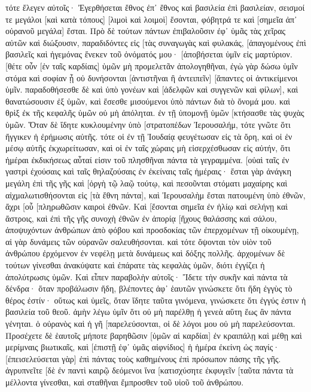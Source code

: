 τότε ἔλεγεν αὐτοῖς· Ἐγερθήσεται ἔθνος ἐπ᾽ ἔθνος καὶ βασιλεία ἐπὶ βασιλείαν, 
σεισμοί τε μεγάλοι [καὶ κατὰ τόπους] [λιμοὶ καὶ λοιμοὶ] ἔσονται, φόβητρά τε καὶ [σημεῖα ἀπ᾽ οὐρανοῦ μεγάλα] ἔσται. 
Πρὸ δὲ τούτων πάντων ἐπιβαλοῦσιν ἐφ᾽ ὑμᾶς τὰς χεῖρας αὐτῶν καὶ διώξουσιν, παραδιδόντες εἰς [τὰς συναγωγὰς καὶ φυλακάς, [ἀπαγομένους ἐπὶ βασιλεῖς καὶ ἡγεμόνας ἕνεκεν τοῦ ὀνόματός μου· 
[ἀποβήσεται ὑμῖν εἰς μαρτύριον. 
[θέτε οὖν [ἐν ταῖς καρδίαις] ὑμῶν μὴ προμελετᾶν ἀπολογηθῆναι, 
ἐγὼ γὰρ δώσω ὑμῖν στόμα καὶ σοφίαν ᾗ οὐ δυνήσονται [ἀντιστῆναι ἢ ἀντειπεῖν] [ἅπαντες οἱ ἀντικείμενοι ὑμῖν. 
παραδοθήσεσθε δὲ καὶ ὑπὸ γονέων καὶ [ἀδελφῶν καὶ συγγενῶν καὶ φίλων], καὶ θανατώσουσιν ἐξ ὑμῶν, 
καὶ ἔσεσθε μισούμενοι ὑπὸ πάντων διὰ τὸ ὄνομά μου. 
καὶ θρὶξ ἐκ τῆς κεφαλῆς ὑμῶν οὐ μὴ ἀπόληται. 
ἐν τῇ ὑπομονῇ ὑμῶν [κτήσασθε τὰς ψυχὰς ὑμῶν. 
Ὅταν δὲ ἴδητε κυκλουμένην ὑπὸ [στρατοπέδων Ἰερουσαλήμ, τότε γνῶτε ὅτι ἤγγικεν ἡ ἐρήμωσις αὐτῆς. 
τότε οἱ ἐν τῇ Ἰουδαίᾳ φευγέτωσαν εἰς τὰ ὄρη, καὶ οἱ ἐν μέσῳ αὐτῆς ἐκχωρείτωσαν, καὶ οἱ ἐν ταῖς χώραις μὴ εἰσερχέσθωσαν εἰς αὐτήν, 
ὅτι ἡμέραι ἐκδικήσεως αὗταί εἰσιν τοῦ πλησθῆναι πάντα τὰ γεγραμμένα. 
[οὐαὶ ταῖς ἐν γαστρὶ ἐχούσαις καὶ ταῖς θηλαζούσαις ἐν ἐκείναις ταῖς ἡμέραις· ἔσται γὰρ ἀνάγκη μεγάλη ἐπὶ τῆς γῆς καὶ [ὀργὴ τῷ λαῷ τούτῳ, 
καὶ πεσοῦνται στόματι μαχαίρης καὶ αἰχμαλωτισθήσονται εἰς [τὰ ἔθνη πάντα], καὶ Ἰερουσαλὴμ ἔσται πατουμένη ὑπὸ ἐθνῶν, ἄχρι [οὗ [πληρωθῶσιν καιροὶ ἐθνῶν. 
Καὶ [ἔσονται σημεῖα ἐν ἡλίῳ καὶ σελήνῃ καὶ ἄστροις, καὶ ἐπὶ τῆς γῆς συνοχὴ ἐθνῶν ἐν ἀπορίᾳ [ἤχους θαλάσσης καὶ σάλου, 
ἀποψυχόντων ἀνθρώπων ἀπὸ φόβου καὶ προσδοκίας τῶν ἐπερχομένων τῇ οἰκουμένῃ, αἱ γὰρ δυνάμεις τῶν οὐρανῶν σαλευθήσονται. 
καὶ τότε ὄψονται τὸν υἱὸν τοῦ ἀνθρώπου ἐρχόμενον ἐν νεφέλῃ μετὰ δυνάμεως καὶ δόξης πολλῆς. 
ἀρχομένων δὲ τούτων γίνεσθαι ἀνακύψατε καὶ ἐπάρατε τὰς κεφαλὰς ὑμῶν, διότι ἐγγίζει ἡ ἀπολύτρωσις ὑμῶν. 
Καὶ εἶπεν παραβολὴν αὐτοῖς· Ἴδετε τὴν συκῆν καὶ πάντα τὰ δένδρα· 
ὅταν προβάλωσιν ἤδη, βλέποντες ἀφ᾽ ἑαυτῶν γινώσκετε ὅτι ἤδη ἐγγὺς τὸ θέρος ἐστίν· 
οὕτως καὶ ὑμεῖς, ὅταν ἴδητε ταῦτα γινόμενα, γινώσκετε ὅτι ἐγγύς ἐστιν ἡ βασιλεία τοῦ θεοῦ. 
ἀμὴν λέγω ὑμῖν ὅτι οὐ μὴ παρέλθῃ ἡ γενεὰ αὕτη ἕως ἂν πάντα γένηται. 
ὁ οὐρανὸς καὶ ἡ γῆ [παρελεύσονται, οἱ δὲ λόγοι μου οὐ μὴ παρελεύσονται. 
Προσέχετε δὲ ἑαυτοῖς μήποτε βαρηθῶσιν [ὑμῶν αἱ καρδίαι] ἐν κραιπάλῃ καὶ μέθῃ καὶ μερίμναις βιωτικαῖς, καὶ [ἐπιστῇ ἐφ᾽ ὑμᾶς αἰφνίδιος] ἡ ἡμέρα ἐκείνη 
ὡς παγίς· [ἐπεισελεύσεται γὰρ] ἐπὶ πάντας τοὺς καθημένους ἐπὶ πρόσωπον πάσης τῆς γῆς. 
ἀγρυπνεῖτε [δὲ ἐν παντὶ καιρῷ δεόμενοι ἵνα [κατισχύσητε ἐκφυγεῖν [ταῦτα πάντα τὰ μέλλοντα γίνεσθαι, καὶ σταθῆναι ἔμπροσθεν τοῦ υἱοῦ τοῦ ἀνθρώπου. 
